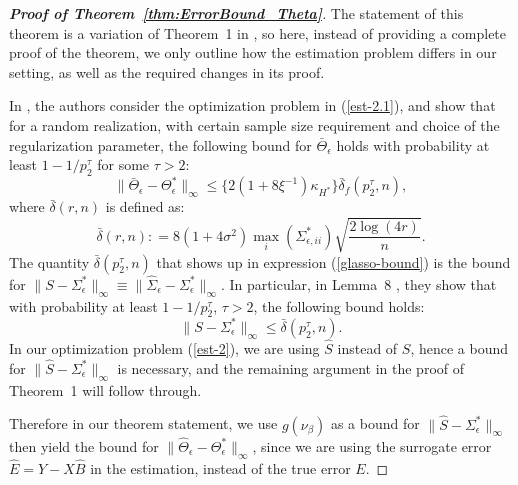 \begin{proof}[\textbf{Proof of Theorem~\ref{thm:ErrorBound_Theta}}]
	The statement of this theorem is a variation of Theorem~1 in \citet{ravikumar2011high}, so here, instead of providing a complete proof of the theorem, we only outline how the estimation problem differs in our setting, as well as the required changes in its proof.
	
	In \citet{ravikumar2011high}, the authors consider the optimization problem in (\ref{est-2.1}), and show that for a random realization, with certain sample size requirement and choice of the regularization parameter, the following bound for $\bar{\Theta}_\epsilon$ holds with probability at least $1-1/p_2^\tau$ for some $\tau>2$:
	\begin{equation}\label{glasso-bound}
	\|\bar{\Theta}_\epsilon -\Theta_\epsilon^*\|_\infty \leq \{2(1+8\xi^{-1})\kappa_{H^*}\}\bar{\delta}_f(p_2^\tau,n),
	\end{equation}
	where $\bar{\delta}(r,n)$ is defined as:
	\begin{equation}\label{delta-bar}
	\bar{\delta}(r,n): = 8(1+4\sigma^2)\max_i(\Sigma^*_{\epsilon,ii})\sqrt{\frac{2\log(4r)}{n}}.
	\end{equation}
	The quantity  $\bar{\delta}(p_2^\tau,n)$ that shows up in expression (\ref{glasso-bound}) is the bound for $\|S-\Sigma_\epsilon^*\|_\infty \equiv \|\widehat{\Sigma}_\epsilon - \Sigma_\epsilon^*\|_\infty$. In particular, in Lemma~8 \citep{ravikumar2011high}, they show that with probability at least $1-1/p_2^\tau$, $\tau>2$,  the following bound holds:
	\begin{equation*}
	\|S - \Sigma_\epsilon^*\|_\infty \leq \bar{\delta}(p_2^\tau,n).
	\end{equation*}
	In our optimization problem (\ref{est-2}), we are using $\widehat{S}$ instead of $S$, hence a bound for $\|\widehat{S}-\Sigma_\epsilon^*\|_\infty$ is necessary, and the remaining argument in the proof of Theorem~1 \citep{ravikumar2011high} will follow through. 
	
	Therefore in our theorem statement, we use $g(\nu_\beta)$ as a bound for $\|\widehat{S}-\Sigma_\epsilon^*\|_\infty$ then yield the bound for $\|\widehat{\Theta}_\epsilon-\Theta^*_\epsilon\|_\infty$, since we are using the surrogate error $\widehat{E}=Y-X\widehat{B}$ in the estimation, instead of the true error $E$. 
\end{proof}


